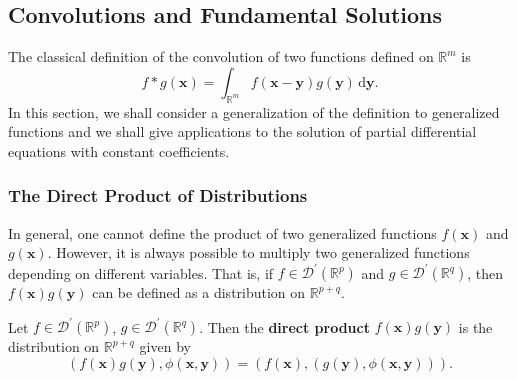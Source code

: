 \subsection{Convolutions and Fundamental Solutions}\label{sec:convolutions-fundamental-solutions}

The classical definition of the convolution of two functions defined on $\mathbb{R}^m$ is
\begin{equation}\label{eq:classical-convolution-definition}
f*g(\bm{x})=\int_{\mathbb{R}^m}f(\bm{x}-\bm{y})g(\bm{y})\,\mathrm{d}\bm{y}.
\end{equation}
In this section, we shall consider a generalization of the definition to generalized functions and we shall give applications to the solution of partial differential equations with constant coefficients.

\subsubsection{The Direct Product of Distributions}\label{subsec:distribution-direct-product}

In general, one cannot define the product of two generalized functions $f(\bm{x})$ and $g(\bm{x})$. However, it is always possible to multiply two generalized functions depending on different variables. That is, if $f\in\mathcal{D}^{\prime}(\mathbb{R}^p)$ and $g\in\mathcal{D}^{\prime}(\mathbb{R}^q)$, then $f(\bm{x})g(\bm{y})$ can be defined as a distribution on $\mathbb{R}^{p+q}$.

\begin{Definition}
\label{def:distribution-direct-product}
Let $f\in\mathcal{D}^{\prime}(\mathbb{R}^p)$, $g\in\mathcal{D}^{\prime}(\mathbb{R}^q)$. Then the \textbf{direct product} $f(\bm{x})g(\bm{y})$ is the distribution on $\mathbb{R}^{p+q}$ given by
\begin{equation}\label{eq:distribution-direct-product-definition}
(f(\bm{x})g(\bm{y}),\phi(\bm{x},\bm{y}))=(f(\bm{x}),(g(\bm{y}),\phi(\bm{x},\bm{y}))).
\end{equation}

\end{Definition}

